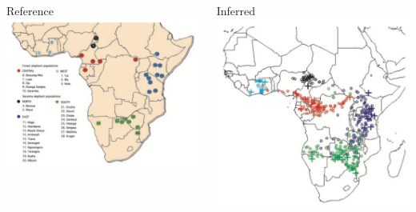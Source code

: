 \documentclass[10pt]{beamer}
\begin{document}
\begin{frame}[t]
\vspace{0.5cm}
	
	\begin{columns}[t]
		\begin{column}{0.5\textwidth}
			\begin{center}
				\textcolor{myblue}{Reference}\\
				\includegraphics[width=1.0\textwidth]{figures/wasser_map1.png}
			\end{center}	
		\end{column}
		
		\begin{column}{0.5\textwidth}
			\begin{center}
				\textcolor{myblue}{Inferred}\\
				\includegraphics[width=1.0\textwidth]{figures/wasser_map2.png}
			\end{center}
		\end{column}
	\end{columns}
\end{frame}
\end{document}
